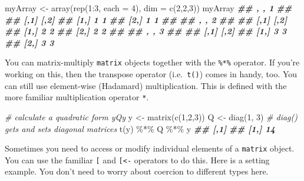 \documentclass[
  12pt,
  krantz2]{krantz}
\makeatletter
\newenvironment{Shaded}{\begin{snugshade}}{\end{snugshade}}
\newcommand{\AttributeTok}[1]{\textcolor[rgb]{0.61,0.61,0.61}{#1}}
\newcommand{\CommentTok}[1]{\textcolor[rgb]{0.37,0.37,0.37}{\textit{#1}}}
\newcommand{\DecValTok}[1]{\textcolor[rgb]{0.06,0.06,0.06}{#1}}
\newcommand{\DocumentationTok}[1]{\textcolor[rgb]{0.37,0.37,0.37}{\textbf{\textit{#1}}}}
\newcommand{\FunctionTok}[1]{\textcolor[rgb]{0,0,0}{#1}}
\newcommand{\NormalTok}[1]{#1}
\newcommand{\OtherTok}[1]{\textcolor[rgb]{0.37,0.37,0.37}{#1}}
\newcommand{\SpecialCharTok}[1]{\textcolor[rgb]{0,0,0}{#1}}
\newenvironment{kframe}{%
\medskip{}
\setlength{\fboxsep}{.8em}
 \def\at@end@of@kframe{}%
 \ifinner\ifhmode%
  \def\at@end@of@kframe{\end{minipage}}%
  \begin{minipage}{\columnwidth}%
 \fi\fi%
 \def\FrameCommand##1{\hskip\@totalleftmargin \hskip-\fboxsep
 \colorbox{shadecolor}{##1}\hskip-\fboxsep
     \hskip-\linewidth \hskip-\@totalleftmargin \hskip\columnwidth}%
 \MakeFramed {\advance\hsize-\width
   \@totalleftmargin\z@ \linewidth\hsize
   \@setminipage}}%
 {\par\unskip\endMakeFramed%
 \at@end@of@kframe}
\renewenvironment{Shaded}{\begin{kframe}}{\end{kframe}}
\makeatother
\begin{document}
\begin{Shaded}
\begin{Highlighting}[]
\NormalTok{myArray }\OtherTok{\textless{}{-}} \FunctionTok{array}\NormalTok{(}\FunctionTok{rep}\NormalTok{(}\DecValTok{1}\SpecialCharTok{:}\DecValTok{3}\NormalTok{, }\AttributeTok{each =} \DecValTok{4}\NormalTok{), }\AttributeTok{dim =} \FunctionTok{c}\NormalTok{(}\DecValTok{2}\NormalTok{,}\DecValTok{2}\NormalTok{,}\DecValTok{3}\NormalTok{))}
\NormalTok{myArray}
\DocumentationTok{\#\# , , 1}
\DocumentationTok{\#\# }
\DocumentationTok{\#\#      [,1] [,2]}
\DocumentationTok{\#\# [1,]    1    1}
\DocumentationTok{\#\# [2,]    1    1}
\DocumentationTok{\#\# }
\DocumentationTok{\#\# , , 2}
\DocumentationTok{\#\# }
\DocumentationTok{\#\#      [,1] [,2]}
\DocumentationTok{\#\# [1,]    2    2}
\DocumentationTok{\#\# [2,]    2    2}
\DocumentationTok{\#\# }
\DocumentationTok{\#\# , , 3}
\DocumentationTok{\#\# }
\DocumentationTok{\#\#      [,1] [,2]}
\DocumentationTok{\#\# [1,]    3    3}
\DocumentationTok{\#\# [2,]    3    3}
\end{Highlighting}
\end{Shaded}

You can matrix-multiply \texttt{matrix} objects together with the \texttt{\%*\%} operator. If you're working on this, then the transpose operator (i.e.~\texttt{t()}) comes in handy, too. You can still use element-wise (Hadamard) multiplication. This is defined with the more familiar multiplication operator \texttt{*}.

\begin{Shaded}
\begin{Highlighting}[]
\CommentTok{\# calculate a quadratic form y\textquotesingle{}Qy}
\NormalTok{y }\OtherTok{\textless{}{-}} \FunctionTok{matrix}\NormalTok{(}\FunctionTok{c}\NormalTok{(}\DecValTok{1}\NormalTok{,}\DecValTok{2}\NormalTok{,}\DecValTok{3}\NormalTok{))}
\NormalTok{Q }\OtherTok{\textless{}{-}} \FunctionTok{diag}\NormalTok{(}\DecValTok{1}\NormalTok{, }\DecValTok{3}\NormalTok{) }\CommentTok{\# diag() gets and sets diagonal matrices}
\FunctionTok{t}\NormalTok{(y) }\SpecialCharTok{\%*\%}\NormalTok{ Q }\SpecialCharTok{\%*\%}\NormalTok{ y}
\DocumentationTok{\#\#      [,1]}
\DocumentationTok{\#\# [1,]   14}
\end{Highlighting}
\end{Shaded}

Sometimes you need to access or modify individual elements of a \texttt{matrix} object. You can use the familiar \texttt{{[}} and \texttt{{[}\textless{}-} operators to do this. Here is a setting example. You don't need to worry about coercion to different types here.
\end{document}
